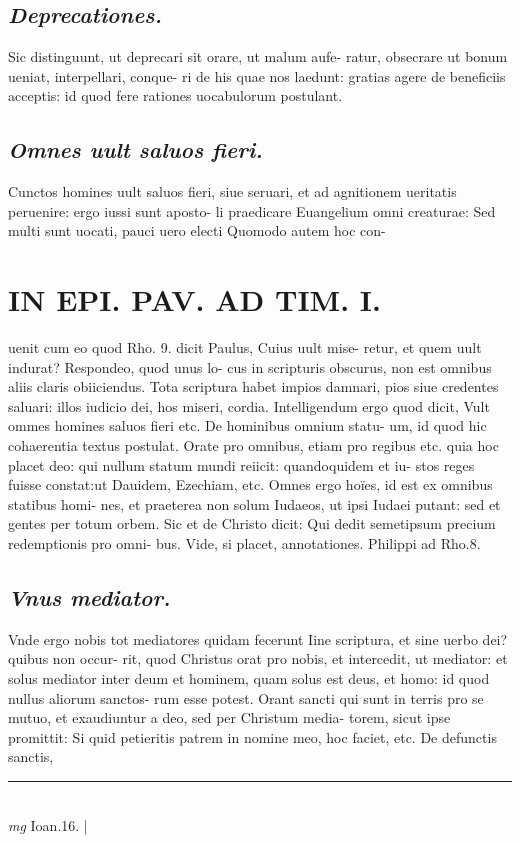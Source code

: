\documentclass{article}
\begin{document}
\begin{pages}
\subsection*{\textit{Deprecationes. }}\pstart Sic distinguunt, ut deprecari sit orare, ut malum aufe- ratur, obsecrare ut bonum ueniat, interpellari, conque- ri de his quae nos laedunt: gratias agere de beneficiis acceptis: id quod fere rationes uocabulorum postulant.  \pend
{}
{}
\subsection*{\textit{Omnes uult saluos fieri. }}\pstart Cunctos homines uult saluos fieri, siue seruari, et ad agnitionem ueritatis peruenire: ergo iussi sunt aposto- li praedicare Euangelium omni creaturae: Sed multi sunt uocati, pauci uero electi Quomodo autem hoc con-  \pend
\section*{IN EPI. PAV. AD TIM. I. }
\marginpar{[ p.84 ]}\pstart uenit cum eo quod Rho. 9. dicit Paulus, Cuius uult mise- retur, et quem uult indurat? Respondeo, quod unus lo- cus in scripturis obscurus, non est omnibus aliis claris obiiciendus. Tota scriptura habet impios damnari, pios siue credentes saluari: illos iudicio dei, hos miseri, cordia. Intelligendum ergo quod dicit, Vult ommes homines saluos fieri etc. De hominibus omnium statu- um, id quod hic cohaerentia textus postulat. Orate pro omnibus, etiam pro regibus etc. quia hoc placet deo: qui nullum statum mundi reiicit: quandoquidem et iu- stos reges fuisse constat:ut Dauidem, Ezechiam, etc. Omnes ergo hoïes, id est ex omnibus statibus homi- nes, et praeterea non solum Iudaeos, ut ipsi Iudaei putant: sed et gentes per totum orbem. Sic et de Christo dicit: Qui dedit semetipsum precium redemptionis pro omni- bus. Vide, si placet, annotationes. Philippi ad Rho.8.  \pend
{}
{}
\subsection*{\textit{Vnus mediator. }}\pstart Vnde ergo nobis tot mediatores quidam fecerunt Iine scriptura, et sine uerbo dei? quibus non occur- rit, quod Christus orat pro nobis, et intercedit, ut mediator: et solus mediator inter deum et hominem, quam solus est deus, et homo: id quod nullus aliorum sanctos- rum esse potest. Orant sancti qui sunt in terris pro se mutuo, et exaudiuntur a deo, sed per Christum media- torem, sicut ipse promittit: Si quid petieritis patrem in nomine meo, hoc faciet, etc. De defunctis sanctis,  \pend
\vspace{0.5cm}\noindent
\vspace{0.2cm}\rule{1cm}{0.2pt}\\ 
\hspace{0.2cm}\textit{mg}
\footnotesize Ioan.16. 
\normalsize| 

\end{pages}
\end{document}
